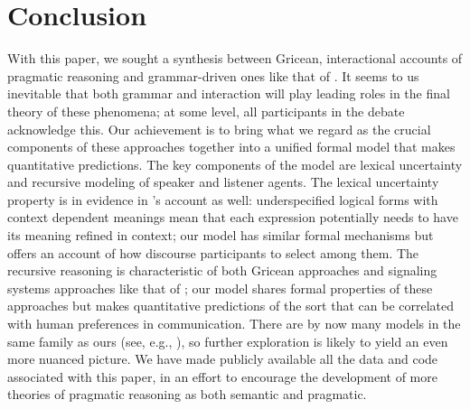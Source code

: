 \documentclass[leqno]{article}
\begin{document}

\section{Conclusion}\label{sec:conclusion}

With this paper, we sought a synthesis between Gricean, interactional
accounts of pragmatic reasoning and grammar-driven ones like that of
\citet{ChierchiaFoxSpector08}. It seems to us inevitable that both
grammar and interaction will play leading roles in the final theory of
these phenomena; at some level, all participants in the debate
acknowledge this. Our achievement is to bring what we regard as the
crucial components of these approaches together into a unified formal
model that makes quantitative predictions. The key components of the
model are lexical uncertainty and recursive modeling of speaker and
listener agents. The lexical uncertainty property is in evidence in
\citeauthor{ChierchiaFoxSpector08}'s account as well: underspecified
logical forms with context dependent meanings mean that each
expression potentially needs to have its meaning refined in context;
our model has similar formal mechanisms but offers an account of how
discourse participants to select among them.  The recursive reasoning
is characteristic of both Gricean approaches and signaling systems
approaches like that of \citet{Lewis69}; our model shares formal
properties of these approaches but makes quantitative predictions of
the sort that can be correlated with human preferences in
communication. There are by now many models in the same family as ours
(see, e.g., 
%
%
\citealt{CamererHo:2004,Jaeger:2011,Smith:Goodman:Frank:2013,Kao-etal:2014}),
so further exploration is likely to yield an even more nuanced
picture. We have made publicly available all the data and code
associated with this paper, in an effort to encourage the development
of more theories of pragmatic reasoning as both semantic and
pragmatic.




\end{document}
